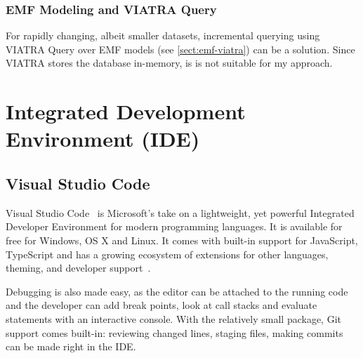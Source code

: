 
\subsubsection{EMF Modeling and VIATRA Query}
For rapidly changing, albeit smaller datasets, incremental querying using VIATRA Query over EMF models (see \cref{sect:emf-viatra}) can be a solution. Since VIATRA stores the database in-memory, is is not suitable for my approach.


\section{Integrated Development Environment (IDE)}
\label{sect:IDE}


\subsection{Visual Studio Code}
Visual Studio Code~\cite{vscode} is Microsoft's take on a lightweight, yet powerful Integrated Developer Environment for modern programming languages. It is available for free for Windows, OS X and Linux. It comes with built-in support for JavaScript, TypeScript and has a growing ecosystem of extensions for other languages, theming, and developer support~\cite{vscode-extensions}.

Debugging is also made easy, as the editor can be attached to the running code and the developer can add break points, look at call stacks and evaluate statements with an interactive console. With the relatively small package, Git support comes built-in: reviewing changed lines, staging files, making commits can be made right in the IDE.

